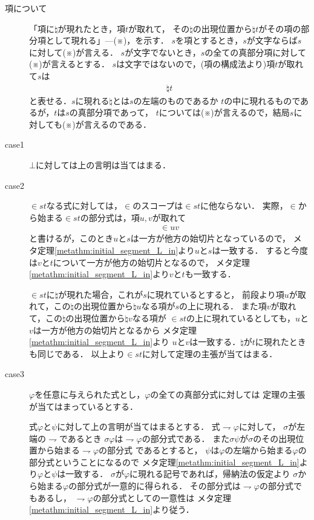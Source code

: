 	\begin{metaprf}\mbox{}
		\begin{description}
			\item[項について]
				「項に$\natural$が現れたとき，項$t$が取れて，
				その$\natural$の出現位置から$\natural t$がその項の部分項として現れる」---(※)，を示す．
				$s$を項とするとき，$s$が文字ならば$s$に対して(※)が言える．
				$s$が文字でないとき，$s$の全ての真部分項に対して(※)が言えるとする．
				$s$は文字ではないので，(項の構成法より)項$t$が取れて$s$は
				\begin{align}
					\natural t
				\end{align}
				と表せる．$s$に現れる$\natural$とは$s$の左端のものであるか
				$t$の中に現れるものであるが，$t$は$s$の真部分項であって，
				$t$については(※)が言えるので，結局$s$に対しても(※)が言えるのである．
			
			\item[case1]
				$\bot$に対しては上の言明は当てはまる．
			
			\item[case2]
				$\in s t$なる式に対しては，$\in$のスコープは$\in s t$に他ならない．
				実際，$\in$から始まる$\in s t$の部分式は，項$u,v$が取れて
				\begin{align}
					\in u v
				\end{align}
				と書けるが，このとき$u$と$s$は一方が他方の始切片となっているので，
				メタ定理\ref{metathm:initial_segment_L_in}より$u$と$s$は一致する．
				すると今度は$v$と$t$について一方が他方の始切片となるので，
				メタ定理\ref{metathm:initial_segment_L_in}より$v$と$t$も一致する．
				
				$\in s t$に$\natural$が現れた場合，これが$s$に現れているとすると，
				前段より項$u$が取れて，この$\natural$の出現位置から$\natural u$なる項が$s$の上に現れる．
				また項$v$が取れて，この$\natural$の出現位置から$\natural v$なる項が
				$\in s t$の上に現れているとしても，$u$と$v$は一方が他方の始切片となるから
				メタ定理\ref{metathm:initial_segment_L_in}より
				$u$と$v$は一致する．$\natural$が$t$に現れたときも同じである．
				以上より$\in s t$に対して定理の主張が当てはまる．
					
			\item[case3]
				$\varphi$を任意に与えられた式とし，$\varphi$の全ての真部分式に対しては
				定理の主張が当てはまっているとする．
		
				式$\varphi$と$\psi$に対して上の言明が当てはまるとする．
				式$\rightharpoondown \varphi$に対して，
				$\sigma$が左端の$\rightharpoondown$であるとき
				$\sigma \varphi$は$\rightharpoondown \varphi$の部分式である．
				また$\sigma \psi$が$\sigma$のその出現位置から始まる$\rightharpoondown \varphi$の部分式
				であるとすると，
				$\psi$は$\varphi$の左端から始まる$\varphi$の部分式ということになるので
				メタ定理\ref{metathm:initial_segment_L_in}より$\varphi$と$\psi$は一致する．
				$\sigma$が$\varphi$に現れる記号であれば，帰納法の仮定より
				$\sigma$から始まる$\varphi$の部分式が一意的に得られる．
				その部分式は$\rightharpoondown \varphi$の部分式でもあるし，
				$\rightharpoondown \varphi$の部分式としての一意性は
				メタ定理\ref{metathm:initial_segment_L_in}より従う．
	

\end{description}
\end{metaprf}
